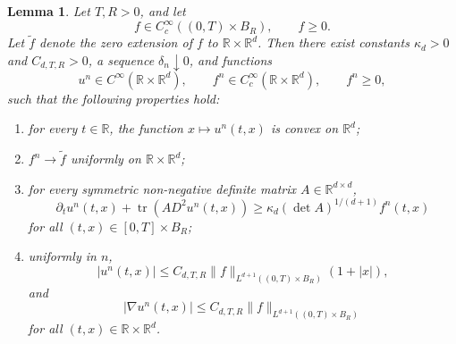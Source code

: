 \documentclass[12pt,oneside, reqno]{amsart}
\newtheorem{lemma}[theorem]{Lemma}
\numberwithin{equation}{section}
\begin{document}
	\begin{lemma}
		\label{lem:global-aleksandrov-regularization}
		Let $T,R>0$, and let
		\[
		f\in C_c^\infty((0,T)\times B_R),
		\qquad f\geq0.
		\]
		Let $\widetilde f$ denote the zero extension of $f$ to
		$\mathbb R\times\mathbb R^d$. Then there exist constants
		$\kappa_d>0$ and $C_{d,T,R}>0$, a sequence
		$\delta_n\downarrow0$, and functions
		\[
		u^n\in C^\infty(\mathbb R\times\mathbb R^d),
		\qquad
		f^n\in C_c^\infty(\mathbb R\times\mathbb R^d),
		\qquad
		f^n\geq0,
		\]
		such that the following properties hold:
		\begin{enumerate}
			\item[\textnormal{(i)}]
			for every $t\in\mathbb R$, the function
			$x\mapsto u^n(t,x)$ is convex on $\mathbb R^d$;
			
			\item[\textnormal{(ii)}]
			$f^n\to\widetilde f$ uniformly on
			$\mathbb R\times\mathbb R^d$;
			
			\item[\textnormal{(iii)}]
			for every symmetric non-negative definite matrix
			$A\in\mathbb R^{d\times d}$,
			\begin{equation}
				\label{eq:appendix-smoothed-aleksandrov-inequality}
				\partial_tu^n(t,x)
				+
				\operatorname{tr}\!\left(A D^2u^n(t,x)\right)
				\geq
				\kappa_d(\det A)^{1/(d+1)}f^n(t,x)
			\end{equation}
			for all $(t,x)\in[0,T]\times B_R$;
			
			\item[\textnormal{(iv)}]
			uniformly in $n$,
			\begin{equation}
				\label{eq:appendix-global-growth-bound}
				|u^n(t,x)|
				\leq
				C_{d,T,R}
				\|f\|_{L^{d+1}((0,T)\times B_R)}
				(1+|x|),
			\end{equation}
			and
			\begin{equation}
				\label{eq:appendix-global-gradient-bound}
				|\nabla u^n(t,x)|
				\leq
				C_{d,T,R}
				\|f\|_{L^{d+1}((0,T)\times B_R)}
			\end{equation}
			for all $(t,x)\in\mathbb R\times\mathbb R^d$.
		\end{enumerate}
	\end{lemma}
	
\end{document}
